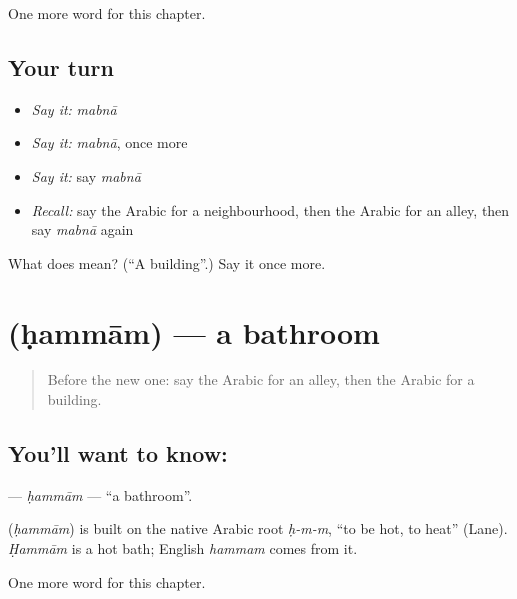 \begin{grammarlens}[title={What you've built}]
One more word for this chapter.
\end{grammarlens}

\subsection*{Your turn}
\begin{itemize}
\raggedright
  \item \emph{Say it:} \emph{mabnā}
  \item \emph{Say it:} \emph{mabnā}, once more
  \item \emph{Say it:} say \emph{mabnā}
  \item \emph{Recall:} say the Arabic for a neighbourhood, then the Arabic for an alley, then say \emph{mabnā} again
\end{itemize}

\begin{tcolorbox}[breakable,colback=teal!4,colframe=teal!35!black,title={Before you move on}]
What does  mean? (\textquotedblleft{}A building\textquotedblright{}.) Say it once more.
\end{tcolorbox}
\section[\texorpdfstring{\ar{حمام} (ḥammām)}{حمام (ḥammām)}]{ (ḥammām) — a bathroom}

\label{lesson:AR-C101-hammam}



\begin{quote}
Before the new one: say the Arabic for an alley, then the Arabic for a building.
\end{quote}

\subsection*{You'll want to know: }
\textbf{} — \emph{ḥammām} — \textquotedblleft{}a bathroom\textquotedblright{}.

\begin{cousinweb}
\textbf{} (\emph{ḥammām}) is built on the native Arabic root \emph{ḥ-m-m}, \textquotedblleft{}to be hot, to heat\textquotedblright{} (Lane). \emph{Ḥammām} is a hot bath; English \emph{hammam} comes from it.
\end{cousinweb}

\begin{grammarlens}[title={What you've built}]
One more word for this chapter.
\end{grammarlens}

